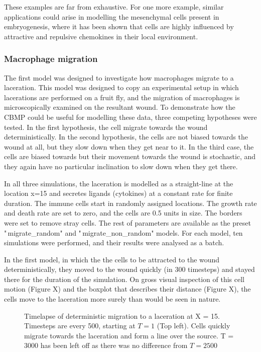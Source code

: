 \documentclass[11.5pt]{article}
\begin{document}
These examples are far from exhaustive. For one more example, similar 
applications could arise in modelling the mesenchymal cells present in 
embryogenesis, where it has been shown that cells are highly influenced 
by attractive and repulsive chemokines in their local environment.

\subsubsection{Macrophage migration}
The first model was designed to investigate how macrophages migrate to a 
laceration. This model was designed to copy an experimental setup in 
which lacerations are performed on a fruit fly, and the migration of 
macrophages is microscopically examined on the resultant wound. To 
demonstrate how the CBMP could be useful for modelling these data, three 
competing hypotheses were tested. In the first hypothesis, the cell 
migrate towards the wound deterministically. In the second hypothesis, 
the cells are not biased towards the wound at all, but they slow down 
when they get near to it. In the third case, the cells are biased 
towards but their movement towards the wound is stochastic, and they 
again have no particular inclination to slow down when they get there.

In all three simulations, the laceration is modelled as a straight-line 
at the location x=15 and secretes ligands (cytokines) at a constant rate 
for finite duration. The immune cells start in randomly assigned 
locations. The growth rate and death rate are set to zero, and the cells 
are 0.5 units in size. The borders were set to remove stray cells. The 
rest of parameters are available as the preset "\,migrate\_random" and 
"\,migrate\_non\_random" models. For each model, ten simulations were 
performed, and their results were analysed as a batch.

In the first model, in which the the cells to be attracted to the wound 
deterministically, they moved to the wound quickly (in 300 timesteps) 
and stayed there for the duration of the simulation. On gross visual 
inspection of this cell motion (Figure X) and the boxplot that describes 
their distance (Figure X), the cells move to the laceration more surely 
than would be seen in nature.

\begin{figure}[H]
\centering
\caption{Timelapse of deterministic 
migration to a laceration at X = 15. Timesteps are every 500, starting 
at \(T = 1\) (Top left). Cells quickly migrate towards the laceration and 
form a line over the source. T = 3000 has been left off as there was no 
difference from \(T = 2500\)}
\end{figure}
\end{document}
